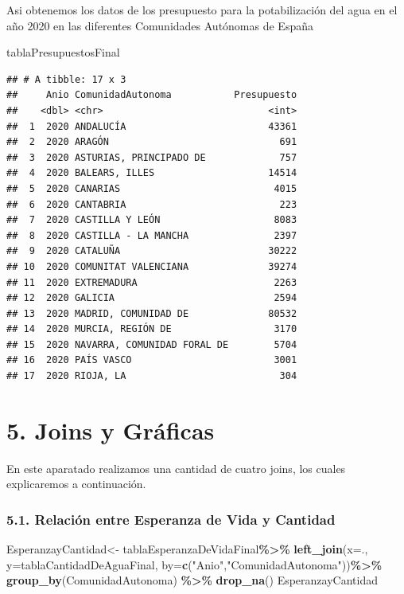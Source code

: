 \documentclass[
]{article}
\newenvironment{Shaded}{\begin{snugshade}}{\end{snugshade}}
\newcommand{\AttributeTok}[1]{\textcolor[rgb]{0.13,0.29,0.53}{#1}}
\newcommand{\FunctionTok}[1]{\textcolor[rgb]{0.13,0.29,0.53}{\textbf{#1}}}
\newcommand{\NormalTok}[1]{#1}
\newcommand{\OtherTok}[1]{\textcolor[rgb]{0.56,0.35,0.01}{#1}}
\newcommand{\SpecialCharTok}[1]{\textcolor[rgb]{0.81,0.36,0.00}{\textbf{#1}}}
\newcommand{\StringTok}[1]{\textcolor[rgb]{0.31,0.60,0.02}{#1}}
\begin{document}
Asi obtenemos los datos de los presupuesto para la potabilización del
agua en el año 2020 en las diferentes Comunidades Autónomas de España

\begin{Shaded}
\begin{Highlighting}[]
\NormalTok{tablaPresupuestosFinal}
\end{Highlighting}
\end{Shaded}

\begin{verbatim}
## # A tibble: 17 x 3
##     Anio ComunidadAutonoma           Presupuesto
##    <dbl> <chr>                             <int>
##  1  2020 ANDALUCÍA                         43361
##  2  2020 ARAGÓN                              691
##  3  2020 ASTURIAS, PRINCIPADO DE             757
##  4  2020 BALEARS, ILLES                    14514
##  5  2020 CANARIAS                           4015
##  6  2020 CANTABRIA                           223
##  7  2020 CASTILLA Y LEÓN                    8083
##  8  2020 CASTILLA - LA MANCHA               2397
##  9  2020 CATALUÑA                          30222
## 10  2020 COMUNITAT VALENCIANA              39274
## 11  2020 EXTREMADURA                        2263
## 12  2020 GALICIA                            2594
## 13  2020 MADRID, COMUNIDAD DE              80532
## 14  2020 MURCIA, REGIÓN DE                  3170
## 15  2020 NAVARRA, COMUNIDAD FORAL DE        5704
## 16  2020 PAÍS VASCO                         3001
## 17  2020 RIOJA, LA                           304
\end{verbatim}

\hypertarget{joins-y-gruxe1ficas}{%
\section{5. Joins y Gráficas}\label{joins-y-gruxe1ficas}}

En este aparatado realizamos una cantidad de cuatro joins, los cuales
explicaremos a continuación.

\hypertarget{relaciuxf3n-entre-esperanza-de-vida-y-cantidad}{%
\subsubsection{5.1. Relación entre Esperanza de Vida y
Cantidad}\label{relaciuxf3n-entre-esperanza-de-vida-y-cantidad}}

\begin{Shaded}
\begin{Highlighting}[]
\NormalTok{EsperanzayCantidad}\OtherTok{\textless{}{-}}\NormalTok{ tablaEsperanzaDeVidaFinal}\SpecialCharTok{\%\textgreater{}\%}
  \FunctionTok{left\_join}\NormalTok{(}\AttributeTok{x=}\NormalTok{., }\AttributeTok{y=}\NormalTok{tablaCantidadDeAguaFinal, }\AttributeTok{by=}\FunctionTok{c}\NormalTok{(}\StringTok{"Anio"}\NormalTok{,}\StringTok{"ComunidadAutonoma"}\NormalTok{))}\SpecialCharTok{\%\textgreater{}\%}
  \FunctionTok{group\_by}\NormalTok{(ComunidadAutonoma) }\SpecialCharTok{\%\textgreater{}\%}
  \FunctionTok{drop\_na}\NormalTok{()}
\NormalTok{EsperanzayCantidad}
\end{Highlighting}
\end{Shaded}
\end{document}
